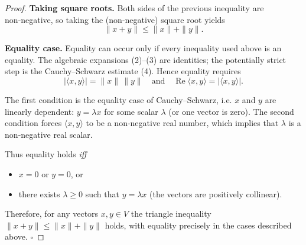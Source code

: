 \begin{proof}
\medskip
\textbf{Taking square roots.}  
Both sides of the previous inequality are non‑negative, so taking the
(non‑negative) square root yields
\[
\|x+y\|\le\|x\|+\|y\|.
\]

\medskip
\textbf{Equality case.}  
Equality can occur only if every inequality used above is an equality.
The algebraic expansions (2)–(3) are identities; the potentially strict step
is the Cauchy–Schwarz estimate (4). Hence equality requires
\[
|\langle x,y\rangle|=\|x\|\,\|y\|\quad\text{and}\quad
\operatorname{Re}\langle x,y\rangle=|\langle x,y\rangle|.
\]

The first condition is the equality case of Cauchy–Schwarz, i.e. \(x\) and
\(y\) are linearly dependent: \(y=\lambda x\) for some scalar \(\lambda\) (or one
vector is zero). The second condition forces \(\langle x,y\rangle\) to be a
non‑negative real number, which implies that \(\lambda\) is a non‑negative real
scalar.  

Thus equality holds \emph{iff}
\begin{itemize}
\item \(x=0\) or \(y=0\), or
\item there exists \(\lambda\ge0\) such that \(y=\lambda x\) (the vectors are
positively collinear).
\end{itemize}

Therefore, for any vectors \(x,y\in V\) the triangle inequality
\(\|x+y\|\le\|x\|+\|y\|\) holds, with equality precisely in the cases
described above. \(\square\)
\end{proof}